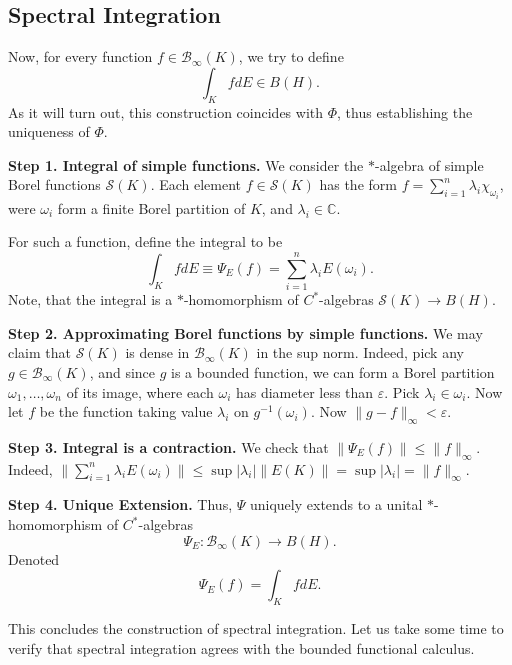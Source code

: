 \subsection{Spectral Integration}

Now, for every function $f \in \mathcal{B}_\infty (K)$, we try to define
\[
	\int _K f d E \in B(H)
.\] 
As it will turn out, this construction coincides with $\Phi$, thus establishing the uniqueness of $\Phi$.

\textbf{Step 1. Integral of simple functions.} We consider the $*$-algebra of simple Borel functions $\mathcal{S}(K)$. Each element $f \in \mathcal{S}(K)$ has the form $f = \sum_{i = 1}^n \lambda_i \chi_{\omega_i}$, were $\omega_i$ form a finite Borel partition of $K$, and $\lambda_i \in \mathbb{C}$.

For such a function, define the integral to be
\[
	\int_K f d E \equiv \Psi_E(f) = \sum_{i = 1}^n \lambda_i E(\omega_i)
.\] 
Note, that the integral is a $*$-homomorphism of $C^*$-algebras $\mathcal{S}(K) \to B(H)$.

\textbf{Step 2. Approximating Borel functions by simple functions.} We may claim that $\mathcal{S}(K)$ is dense in $\mathcal{B}_\infty (K)$ in the sup norm. Indeed, pick any $g \in \mathcal{B}_\infty (K)$, and since $g$ is a bounded function, we can form a Borel partition $\omega_1, \ldots, \omega_n$ of its image, where each $\omega_i$ has diameter less than $\varepsilon$. Pick $\lambda_i \in \omega_i$. Now let $f$ be the function taking value $\lambda_i$ on $g^{-1}(\omega_i)$. Now $\|g - f\|_\infty  < \varepsilon$.

\textbf{Step 3. Integral is a contraction.} We check that $\|\Psi_E(f)\| \le \|f\|_\infty$. Indeed, $\|\sum_{i = 1}^n \lambda_i E(\omega_i)\|\le \sup |\lambda_i| \|E(K)\| = \sup |\lambda_i| = \|f\|_\infty $.

\textbf{Step 4. Unique Extension.} Thus, $\Psi$ uniquely extends to a unital $*$-homomorphism of $C^*$-algebras
\[
	\Psi_E: \mathcal{B}_\infty (K) \to B(H)
.\] 
Denoted
\[
	\Psi_E(f) = \int _K f d E
.\] 

This concludes the construction of spectral integration. Let us take some time to verify that spectral integration agrees with the bounded functional calculus.

